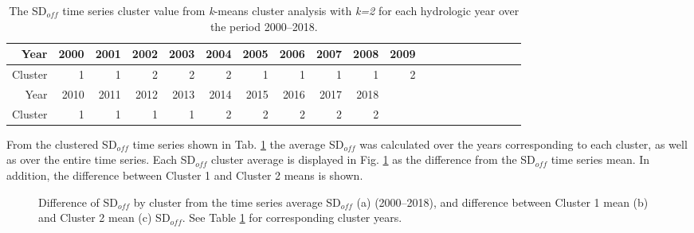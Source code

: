 \documentclass{tATO2e}
\newcommand{\sdoff}{SD$_{off}$}
\begin{document}
\begin{table}[ht]
	\centering
	\begin{tabular}{r|rrrrrrrrrrrrrrrrrrr}
		\hline
		Year & 2000 & 2001 & 2002 & 2003 & 2004 & 2005 & 2006 & 2007 & 2008 & 2009 \\ 
		\hline
		Cluster & 1 & 1 & 2 & 2 & 2 & 1 & 1 & 1 & 1 & 2\\
		\hline
		\hline
		Year & 2010 & 2011 & 2012 & 2013 & 2014 & 2015 & 2016 & 2017 & 2018 \\
		\hline
		Cluster & 1 & 1 & 1 & 1 & 2 & 2 & 2 & 2 & 2 \\ 
		\hline
	\end{tabular}
	\caption{The \sdoff{} time series cluster value from \textit{k}-means cluster analysis with \textit{k=2} for each hydrologic year over the period 2000--2018.} 
	\label{tab:sdoff_k_ts}
\end{table}

From the clustered \sdoff{} time series shown in Tab. \ref{tab:sdoff_k_ts} the average \sdoff{} was calculated over the years corresponding to each cluster, as well as over the entire time series. Each \sdoff{} cluster average is displayed in Fig. \ref{fig:clust_means} as the difference from the \sdoff{} time series mean. In addition, the difference between Cluster 1 and Cluster 2 means is shown. 


\begin{figure}[!h]
	\begin{center}
		\hspace{5pt}
		\hspace{5pt}
		\hspace{5pt}
		\hspace{5pt}
		\caption{Difference of \sdoff{} by cluster from the time series average \sdoff{} (a) (2000--2018), and difference between Cluster 1 mean (b) and Cluster 2 mean (c) \sdoff{}. See Table \ref{tab:sdoff_k_ts} for corresponding cluster years.}
		\label{fig:clust_means}
	\end{center}
\end{figure}
\end{document}
